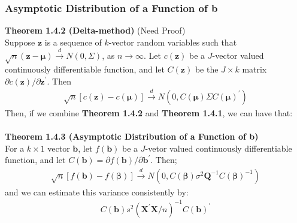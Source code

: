 \documentclass{article}
\begin{document}
\subsubsection{Asymptotic Distribution of a Function of b}
\textbf{Theorem 1.4.2 (Delta-method)} (Need Proof)\\
Suppose $\boldsymbol{z}$ is a sequence of $k$-vector random variables such that $\sqrt{n}(\boldsymbol{z} - \boldsymbol{\mu}) \xrightarrow{d} N(0, \Sigma)$, as $n \to \infty$. Let $c(\boldsymbol{z})$ be a $J$-vector valued continuously differentiable function, and let $C(\boldsymbol{z})$ be the $J \times k$ matrix $\partial c(\boldsymbol{z}) / \partial \boldsymbol{z}^\prime$. Then
	\begin{align*}
		\sqrt{n}[c(\boldsymbol{z}) - c(\boldsymbol{\mu})] \xrightarrow{d} N(0, C(\boldsymbol{\mu}) \Sigma C(\boldsymbol{\mu})^\prime)
	\end{align*}
Then, if we combine \textbf{Theorem 1.4.2} and \textbf{Theorem 1.4.1}, we can have that:\\\\
\textbf{Theorem 1.4.3 (Asymptotic Distribution of a Function of b)}\\
For a $k \times 1$ vector $\boldsymbol{b}$, let $f(\boldsymbol{b})$ be a $J$-vetor valued continuously differentiable function, and let $C(\boldsymbol{b}) = \partial f(\boldsymbol{b}) / \partial \boldsymbol{b}^\prime$. Then;
	\begin{align*}
		\sqrt{n} [f(\boldsymbol{b}) - f(\boldsymbol{\beta})] \xrightarrow{d} N(0, C(\boldsymbol{\beta}) \sigma^2 \boldsymbol{Q}^{-1} C(\boldsymbol{\beta})^{-1})
	\end{align*}
and we can estimate this variance consistently by:
	\begin{align*}
		C(\boldsymbol{b}) s^2 (\boldsymbol{X}^\prime \boldsymbol{X} / n)^{-1} C(\boldsymbol{b})^\prime
	\end{align*}
\end{document}
